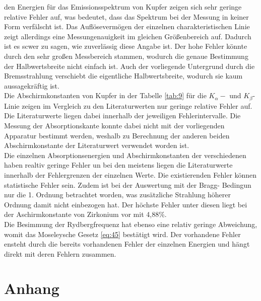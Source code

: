 \justifying den Energien für das Emissionsspektrum von Kupfer zeigen sich sehr geringe relative Fehler
auf, was bedeutet, dass das Spektrum bei der Messung in keiner Form verfälscht ist.
Das Auflösevermögen der einzelnen charakteristischen Linie zeigt allerdings eine
Messungenauigkeit im gleichen Größenbereich  auf. Dadurch ist es scwer zu sagen,
wie zuverlässig diese Angabe ist. Der hohe Fehler könnte durch den sehr großen 
Messbereich stammen, wodurch die genaue Bestimmung der Halbwertsbreite nicht
einfach ist. Auch der vorliegende Untergrund durch die Bremsstrahlung 
verschiebt die eigentliche Halbwertsbreite, wodurch sie kaum
aussagekräftig ist.\\ 
Die Abschirmkonstanten von Kupfer in der Tabelle \ref{tab:9} für die $K_{\alpha}- $
und $K_{\beta} $-Linie zeigen im Vergleich zu den Literaturwerten nur geringe relative
Fehler auf. Die Literaturwerte liegen dabei innerhalb der jeweiligen Fehlerintervalle.
Die Messung der Absorptionskante konnte dabei nicht mit der vorliegenden Apparatur
bestimmt werden, weshalb zu Berechnung der anderen beiden Abschirmkonstante der 
Literaturwert verwendet worden ist.\\
Die einzelnen Absorptionsenergien und Abschirmkonstanten der verschiedenen haben
realtiv geringe Fehler un bei den meistens liegen die Literaturwerte innerhalb
der Fehlergrenzen der einzelnen Werte. Die existierenden Fehler können 
statistische Fehler sein. Zudem ist bei der Auswertung mit der Bragg-
Bedingun nur die 1. Ordnung betrachtet worden, was zusätzliche
Strahlung höherer Ordnung damit nicht einbezogen hat.
Der höchste Fehler unter diesen
liegt bei der Aschirmkonstante von Zirkonium vor mit 4,88\%. \\
Die Besimmung der Rydbergfrequenz hat ebenso eine relativ geringe Abweichung,
womit das Moseleysche Gesetz \eqref{eq:45} bestätigt wird. Der vorhandene
Fehler ensteht durch die bereits vorhandenen Fehler der einzelnen Energien und
hängt direkt mit deren Fehlern zusammen.



\newpage
\printbibliography
\newpage
\section{Anhang}

